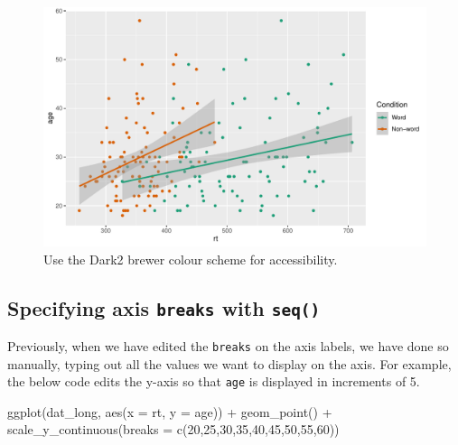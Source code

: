 \documentclass[
  english,
  doc,floatsintext]{apa6}
\newenvironment{Shaded}{\begin{snugshade}}{\end{snugshade}}
\newcommand{\AttributeTok}[1]{\textcolor[rgb]{0.77,0.63,0.00}{#1}}
\newcommand{\DecValTok}[1]{\textcolor[rgb]{0.00,0.00,0.81}{#1}}
\newcommand{\FunctionTok}[1]{\textcolor[rgb]{0.00,0.00,0.00}{#1}}
\newcommand{\NormalTok}[1]{#1}
\newcommand{\SpecialCharTok}[1]{\textcolor[rgb]{0.00,0.00,0.00}{#1}}
\begin{document}
\begin{figure}

{\centering \includegraphics[width=1\linewidth]{images/brewer-1} 

}

\caption{Use the Dark2 brewer colour scheme for accessibility.}\label{fig:brewer}
\end{figure}

\hypertarget{specifying-axis-breaks-with-seq}{%
\subsection{\texorpdfstring{Specifying axis \texttt{breaks} with \texttt{seq()}}{Specifying axis breaks with seq()}}\label{specifying-axis-breaks-with-seq}}

Previously, when we have edited the \texttt{breaks} on the axis labels, we have done so manually, typing out all the values we want to display on the axis. For example, the below code edits the y-axis so that \texttt{age} is displayed in increments of 5.

\begin{Shaded}
\begin{Highlighting}[]
\FunctionTok{ggplot}\NormalTok{(dat\_long, }\FunctionTok{aes}\NormalTok{(}\AttributeTok{x =}\NormalTok{ rt, }\AttributeTok{y =}\NormalTok{ age)) }\SpecialCharTok{+}
  \FunctionTok{geom\_point}\NormalTok{() }\SpecialCharTok{+}
  \FunctionTok{scale\_y\_continuous}\NormalTok{(}\AttributeTok{breaks =} \FunctionTok{c}\NormalTok{(}\DecValTok{20}\NormalTok{,}\DecValTok{25}\NormalTok{,}\DecValTok{30}\NormalTok{,}\DecValTok{35}\NormalTok{,}\DecValTok{40}\NormalTok{,}\DecValTok{45}\NormalTok{,}\DecValTok{50}\NormalTok{,}\DecValTok{55}\NormalTok{,}\DecValTok{60}\NormalTok{))}
\end{Highlighting}
\end{Shaded}
\end{document}
